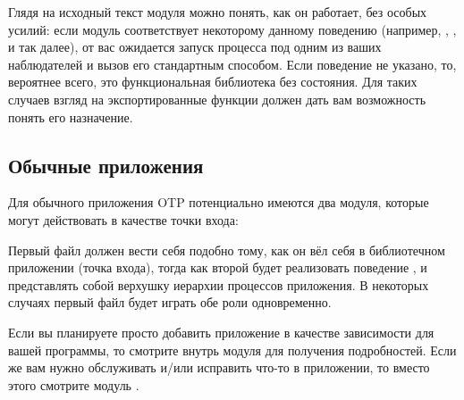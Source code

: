 Глядя на исходный текст модуля можно понять, как он работает, без особых усилий: если модуль соответствует некоторому данному поведению (например, , , и так далее), от вас ожидается запуск процесса под одним из ваших наблюдателей и вызов его стандартным способом. Если поведение не указано, то, вероятнее всего, это функциональная библиотека без состояния. Для таких случаев взгляд на экспортированные функции должен дать вам возможность понять его назначение.


\subsection{Обычные приложения}
\label{subsec:dive-regular-applications}

Для обычного приложения OTP потенциально имеются два модуля, которые могут действовать в качестве точки входа: 

\begin{enumerate*}
	\item {}
	\item {}
\end{enumerate*}

Первый файл должен вести себя подобно тому, как он вёл себя в библиотечном приложении (точка входа), тогда как второй будет реализовать поведение , и представлять собой верхушку иерархии процессов приложения. В некоторых случаях первый файл будет играть обе роли одновременно.

Если вы планируете просто добавить приложение в качестве зависимости для вашей программы, то смотрите внутрь модуля  для получения подробностей. Если же вам нужно обслуживать и/или исправить что-то в приложении, то вместо этого смотрите модуль .

